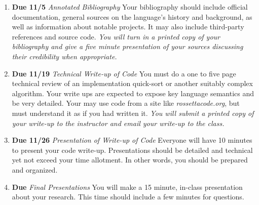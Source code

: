 \documentclass[10pt]{article}
\begin{document}
\begin{enumerate}
\item \textbf{Due 11/5} \textit{Annotated Bibliography }
Your bibliography should include official documentation, general sources on the language's history and background, as well as information about notable projects.  It may also include third-party references and source code.  \textit{You will turn in a printed copy of your bibliography and give a five minute presentation of your sources discussing their credibility when appropriate.}
\item \textbf{Due 11/19} \textit{Technical Write-up of Code}
You must do a one to five page technical review of an implementation quick-sort or another suitably complex algorithm.  Your write ups are expected to expose key language semantics and be very detailed.  Your may use code from a site like \textit{rossettacode.org}, but must understand it  as if you had written it.  \textit{You will submit a printed copy of your write-up to the instructor and email your write-up to the class.}  
\item \textbf{Due 11/26} \textit{Presentation of Write-up of Code}
Everyone will have 10 minutes to present your code write-up. Presentations should be detailed and technical yet not exceed your time allotment. In other words, you should be prepared and organized. 
\item \textbf{Due } \textit{Final Presentations}
You will make a 15 minute, in-class presentation about your research.  This time should include a few minutes for questions.  
\end{enumerate}
\end{document}
